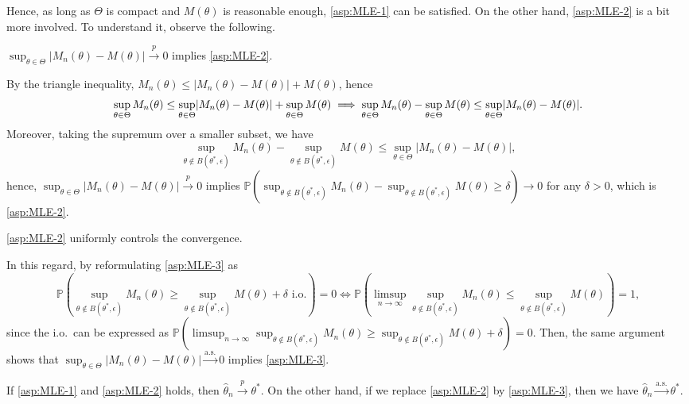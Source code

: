 Hence, as long as \(\Theta \) is compact and \(M(\theta )\) is reasonable enough, \autoref{asp:MLE-1} can be satisfied. On the other hand, \autoref{asp:MLE-2} is a bit more involved. To understand it, observe the following.

\begin{claim}
	\(\sup _{\theta \in \Theta } \lvert M_n(\theta ) - M(\theta ) \rvert \overset{p}{\to} 0\) implies \autoref{asp:MLE-2}.
\end{claim}
\begin{explanation}
	By the triangle inequality, \(M_n(\theta ) \leq \lvert M_n(\theta ) - M(\theta ) \rvert + M(\theta )\), hence
	\[
		\sup _{\theta \in \Theta } M_n(\theta )
		\leq \sup _{\theta \in \Theta } \lvert M_n(\theta ) - M(\theta ) \rvert  + \sup _{\theta \in \Theta }M(\theta ) \\
		\implies \sup _{\theta \in \Theta } M_n(\theta ) - \sup _{\theta \in \Theta }M(\theta )
		\leq \sup _{\theta \in \Theta }\lvert M_n(\theta ) - M(\theta ) \rvert.
	\]
	Moreover, taking the supremum over a smaller subset, we have
	\[
		\sup _{\theta \notin B(\theta^{\ast}, \epsilon) } M_n(\theta ) - \sup _{\theta \notin B(\theta^{\ast}, \epsilon) }M(\theta )
		\leq \sup _{\theta \in \Theta }\lvert M_n(\theta ) - M(\theta ) \rvert,
	\]
	hence, \(\sup _{\theta \in \Theta } \lvert M_n(\theta ) - M(\theta ) \rvert \overset{p}{\to} 0\) implies \(\mathbb{P} ( \sup _{\theta \notin B(\theta ^{\ast} , \epsilon )} M_n(\theta ) - \sup _{\theta \notin B(\theta ^{\ast} , \epsilon )} M(\theta ) \geq \delta ) \to 0\) for any \(\delta > 0\), which is \autoref{asp:MLE-2}.
\end{explanation}

\begin{intuition}
	\autoref{asp:MLE-2} uniformly controls the convergence.
\end{intuition}

In this regard, by reformulating \autoref{asp:MLE-3} as
\[
	\mathbb{P} \left( \sup _{\theta \notin B(\theta ^{\ast} , \epsilon )} M_n(\theta ) \geq \sup _{\theta \notin B(\theta ^{\ast} , \epsilon )} M(\theta ) + \delta \text{ i.o.} \right) = 0
	\iff \mathbb{P} \left( \limsup_{n \to \infty} \sup _{\theta \notin B(\theta ^{\ast} , \epsilon )} M_n(\theta ) \leq \sup _{\theta \notin B(\theta ^{\ast} , \epsilon )} M(\theta ) \right) = 1,
\]
since the i.o.\ can be expressed as \(\mathbb{P} ( \limsup_{n \to \infty} \sup _{\theta \notin B(\theta ^{\ast} , \epsilon )} M_n(\theta ) \geq \sup _{\theta \notin B(\theta ^{\ast} , \epsilon )} M(\theta ) + \delta  ) = 0\). Then, the same argument shows that \(\sup _{\theta \in \Theta } \lvert M_n(\theta ) - M(\theta ) \rvert \overset{\text{a.s.} }{\to} 0\) implies \autoref{asp:MLE-3}.

\begin{theorem}\label{thm:M-estimator-consistency}
	If \autoref{asp:MLE-1} and \autoref{asp:MLE-2} holds, then \(\hat{\theta} _n \overset{p}{\to} \theta ^{\ast} \). On the other hand, if we replace \autoref{asp:MLE-2} by \autoref{asp:MLE-3}, then we have \(\hat{\theta} _n \overset{\text{a.s.} }{\to} \theta ^{\ast} \).
\end{theorem}